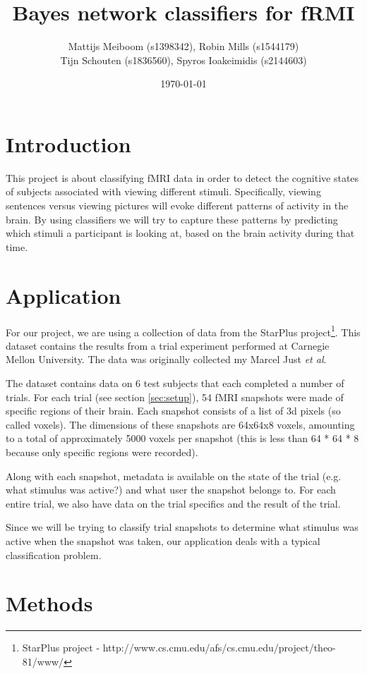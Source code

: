 \documentclass[a4paper, 11pt]{scrartcl}
\title{\Large Bayes network classifiers for fRMI}
\author{\small Mattijs Meiboom (s1398342), Robin Mills (s1544179)\\
			\small Tijn Schouten (s1836560), Spyros Ioakeimidis (s2144603)}
\date{\small \today}
\begin{document}
\maketitle

\thispagestyle{empty}

\section{Introduction}

This project is about classifying fMRI data in order to detect the cognitive states of subjects associated with viewing different stimuli. Specifically, viewing sentences versus viewing pictures will evoke different patterns of activity in the brain. By using classifiers we will try to capture these patterns by predicting which stimuli a participant is looking at, based on the brain activity during that time.

\section{Application}

For our project, we are using a collection of data from the StarPlus project\footnote{StarPlus project - http://www.cs.cmu.edu/afs/cs.cmu.edu/project/theo-81/www/}. This dataset contains the results from a trial experiment performed at Carnegie Mellon University. The data was originally collected my Marcel Just \textit{et al}.

The dataset contains data on 6 test subjects that each completed a number of trials. For each trial (see section \ref{sec:setup}), 54 fMRI snapshots were made of specific regions of their brain. Each snapshot consists of a list of 3d pixels (so called voxels). The dimensions of these snapshots are 64x64x8 voxels, amounting to a total of approximately 5000 voxels per snapshot (this is less than 64 * 64 * 8 because only specific regions were recorded).

Along with each snapshot, metadata is available on the state of the trial (e.g. what stimulus was active?) and what user the snapshot belongs to. For each entire trial, we also have data on the trial specifics and the result of the trial.

Since we will be trying to classify trial snapshots to determine what stimulus was active when the snapshot was taken, our application deals with a typical classification problem.

\section{Methods}
\end{document}
